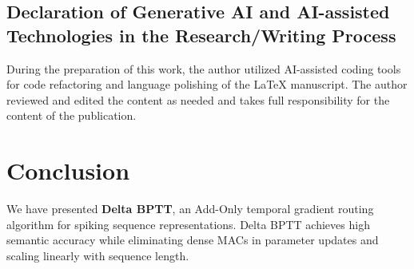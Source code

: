 \documentclass[10pt,journal,compsoc]{IEEEtran}
\begin{document}
\subsection*{Declaration of Generative AI and AI-assisted Technologies in the Research/Writing Process}
During the preparation of this work, the author utilized AI-assisted coding tools for code refactoring and language polishing of the LaTeX manuscript. The author reviewed and edited the content as needed and takes full responsibility for the content of the publication.

\section{Conclusion}
We have presented \textbf{Delta BPTT}, an Add-Only temporal gradient routing algorithm for spiking sequence representations. Delta BPTT achieves high semantic accuracy while eliminating dense MACs in parameter updates and scaling linearly with sequence length.



\end{document}
